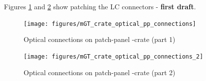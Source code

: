 \clearpage

Figures \ref{fig:com-hard:mGT_crate_optical_pp_connections} and \ref{fig:com-hard:mGT_crate_optical_pp_connections_2} 
show patching the LC connectors - \textbf{first draft}.

\begin{figure}[htb]
\centering
\texttt{[image: figures/mGT\_crate\_optical\_pp\_connections]}
\caption{Optical connections on patch-panel \ugt-crate (part 1)} 
\label{fig:com-hard:mGT_crate_optical_pp_connections}
\end{figure}

\begin{figure}[htb]
\centering
\texttt{[image: figures/mGT\_crate\_optical\_pp\_connections\_2]}
\caption{Optical connections on patch-panel \ugt-crate (part 2)} 
\label{fig:com-hard:mGT_crate_optical_pp_connections_2}
\end{figure}

\clearpage

